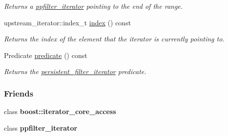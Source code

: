 \begin{DoxyCompactItemize}
\begin{DoxyCompactList}\small\item\em Returns a \hyperlink{classtrsl_1_1ppfilter__iterator}{ppfilter\_\-iterator} pointing to the end of the range. \item\end{DoxyCompactList}\item 
\hypertarget{classtrsl_1_1ppfilter__iterator_a801f61c794cc3b79f1acd9d5f9606087}{
upstream\_\-iterator::index\_\-t \hyperlink{classtrsl_1_1ppfilter__iterator_a801f61c794cc3b79f1acd9d5f9606087}{index} () const }
\label{classtrsl_1_1ppfilter__iterator_a801f61c794cc3b79f1acd9d5f9606087}

\begin{DoxyCompactList}\small\item\em Returns the index of the element that the iterator is currently pointing to. \item\end{DoxyCompactList}\item 
\hypertarget{classtrsl_1_1ppfilter__iterator_aef81ab99e1db57bd682036c0d62f4018}{
Predicate \hyperlink{classtrsl_1_1ppfilter__iterator_aef81ab99e1db57bd682036c0d62f4018}{predicate} () const }
\label{classtrsl_1_1ppfilter__iterator_aef81ab99e1db57bd682036c0d62f4018}

\begin{DoxyCompactList}\small\item\em Returns the \hyperlink{classtrsl_1_1persistent__filter__iterator}{persistent\_\-filter\_\-iterator} predicate. \item\end{DoxyCompactList}\end{DoxyCompactItemize}
\subsubsection*{Friends}
\begin{DoxyCompactItemize}
\item 
\hypertarget{classtrsl_1_1ppfilter__iterator_ac09f73e325921cc50ebcd96bed0f8096}{
class {\bfseries boost::iterator\_\-core\_\-access}}
\label{classtrsl_1_1ppfilter__iterator_ac09f73e325921cc50ebcd96bed0f8096}

\item 
\hypertarget{classtrsl_1_1ppfilter__iterator_ac3c82da2ca64e375b4b4fac8b09b5d40}{
class {\bfseries ppfilter\_\-iterator}}
\label{classtrsl_1_1ppfilter__iterator_ac3c82da2ca64e375b4b4fac8b09b5d40}

\end{DoxyCompactItemize}



